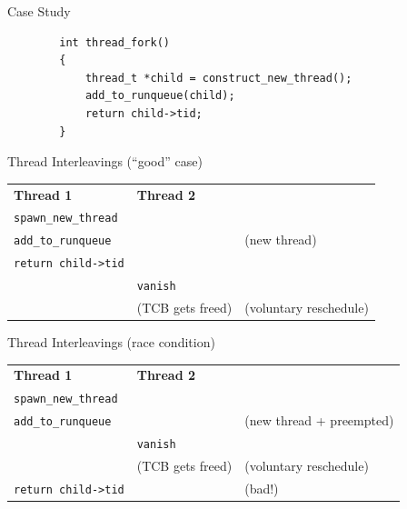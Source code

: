\documentclass[xcolor=dvipsnames]{beamer}
\begin{document}

\begin{frame}[fragile]{Case Study}
	\begin{center}
	\begin{verbatim}
	    int thread_fork()
	    {
	        thread_t *child = construct_new_thread();
	        add_to_runqueue(child);
	        return child->tid;
	    }
	\end{verbatim}
	\end{center}

\end{frame}

\begin{frame}{Thread Interleavings (``good'' case)}
	\begin{tabular}{|l|l|l}
		\cline{1-2}
		{\bf Thread 1} & {\bf Thread 2} & \\
		\cline{1-2}
		\texttt{spawn\_new\_thread} && \\
		\cline{1-2}
		\texttt{add\_to\_runqueue} && (new thread) \\
		\cline{1-2}
		\texttt{return child->tid} &&  \\
		\cline{1-2}
		& \texttt{vanish} & \\
		\cline{1-2}
		& (TCB gets freed) & (voluntary reschedule) \\
		\cline{1-2}
	\end{tabular}
\end{frame}

\begin{frame}{Thread Interleavings (race condition)}
	\begin{tabular}{|l|l|l}
		\cline{1-2}
		{\bf Thread 1} & {\bf Thread 2} & \\
		\cline{1-2}
		\texttt{spawn\_new\_thread} && \\
		\cline{1-2}
		\texttt{add\_to\_runqueue} && (new thread + preempted) \\
		\cline{1-2}
		& \texttt{vanish} & \\
		\cline{1-2}
		& (TCB gets freed) & (voluntary reschedule) \\
		\cline{1-2}
		\texttt{return child->tid} && (bad!) \\
		\cline{1-2}
	\end{tabular}
\end{frame}
\end{document}
